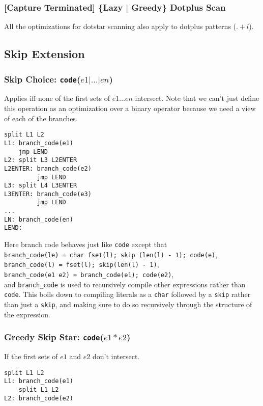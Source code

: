 \subsubsection{[Capture Terminated] \{Lazy $\rvert$ Greedy\} Dotplus Scan}

All the optimizations for dotstar scanning also apply to dotplus
patterns ($.+l$).

\subsection{Skip Extension}

\subsubsection{Skip Choice: {\tt code}($e1 \rvert \dots \rvert en$)}

Applies iff none of the first sets of $e1 \dots en$ intersect. Note that
we can't just define this operation as an optimization over a binary
operator because we need a view of each of the branches.

\begin{verbatim}
split L1 L2
L1: branch_code(e1)
    jmp LEND
L2: split L3 L2ENTER
L2ENTER: branch_code(e2)
         jmp LEND
L3: split L4 L3ENTER
L3ENTER: branch_code(e3)
         jmp LEND
...
LN: branch_code(en)
LEND:
\end{verbatim}

Here branch code behaves just like \verb'code' except that \\
\verb'branch_code(le) = char fset(l); skip (len(l) - 1); code(e)', \\
\verb'branch_code(l) = fset(l); skip(len(l) - 1)', \\
\verb'branch_code(e1 e2) = branch_code(e1); code(e2)', \\
and \verb'branch_code' is used to recursively compile
other expressions rather than \verb'code'. This boils
down to compiling literals as a \verb'char' followed
by a \verb'skip' rather than just a \verb'skip', and
making sure to do so recursively through the structure
of the expression.

\subsubsection{Greedy Skip Star: {\tt code}($e1*e2$)}

If the first sets of $e1$ and $e2$ don't intersect.

\begin{verbatim}
split L1 L2
L1: branch_code(e1)
    split L1 L2
L2: branch_code(e2)
\end{verbatim}

